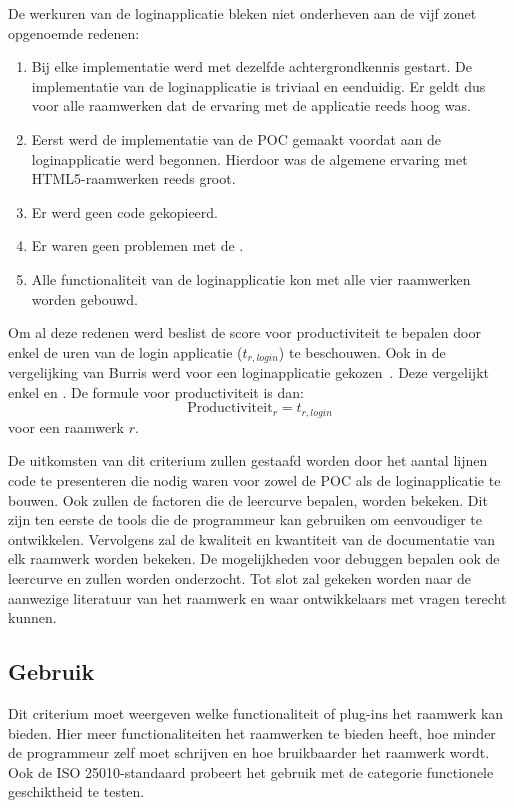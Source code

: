 De werkuren van de loginapplicatie bleken niet onderheven aan de vijf zonet opgenoemde redenen:
\begin{enumerate}
\item Bij elke implementatie werd met dezelfde achtergrondkennis gestart.  
De implementatie van de loginapplicatie is triviaal en eenduidig.
Er geldt dus voor alle raamwerken dat de ervaring met de applicatie reeds hoog was.
\item Eerst werd de implementatie van de POC gemaakt voordat aan de loginapplicatie werd begonnen.
Hierdoor was de algemene ervaring met HTML5-raamwerken reeds groot.
\item Er werd geen code gekopieerd. 
\item Er waren geen problemen met de .
\item Alle functionaliteit van de loginapplicatie kon met alle vier raamwerken worden gebouwd.
\end{enumerate}
Om al deze redenen werd beslist de score voor productiviteit te bepalen door enkel de uren van de login applicatie ($t_{r,login}$) te beschouwen.
Ook in de vergelijking van Burris werd voor een loginapplicatie gekozen~\cite{Burris}.
Deze vergelijkt enkel \st{} en \jqm{}.
De formule voor productiviteit is dan:
\begin{equation}
  \text{Productiviteit}_r = t_{r,login}
  \label{eq:productiviteit-enhanced}
\end{equation}
voor een raamwerk $r$.

De uitkomsten van dit criterium zullen gestaafd worden door het aantal lijnen code te presenteren die nodig waren voor zowel de POC als de loginapplicatie te bouwen.
Ook zullen de factoren die de leercurve bepalen, worden bekeken. 
Dit zijn ten eerste de tools die de programmeur kan gebruiken om eenvoudiger te ontwikkelen.
Vervolgens zal de kwaliteit en kwantiteit van de documentatie van elk raamwerk worden bekeken.
De mogelijkheden voor debuggen bepalen ook de leercurve en zullen worden onderzocht.
Tot slot zal gekeken worden naar de aanwezige literatuur van het raamwerk en waar ontwikkelaars met vragen terecht kunnen.


\subsection{Gebruik}
\label{sec:vergelijking-gebruik}
Dit criterium moet weergeven welke functionaliteit of plug-ins het raamwerk kan bieden.
Hier meer functionaliteiten het raamwerken te bieden heeft,  hoe minder de programmeur zelf moet schrijven en hoe bruikbaarder het raamwerk wordt.
Ook de ISO 25010-standaard probeert het gebruik met de categorie functionele geschiktheid te testen.

